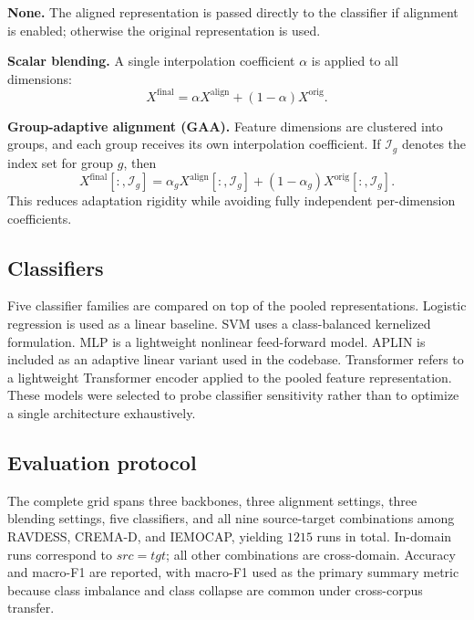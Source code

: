 ﻿\documentclass[10pt,twocolumn,letterpaper]{article}
\begin{document}
\textbf{None.} The aligned representation is passed directly to the classifier if alignment is enabled; otherwise the original representation is used.

\textbf{Scalar blending.} A single interpolation coefficient $\alpha$ is applied to all dimensions:
\begin{equation}
X^{\mathrm{final}} = \alpha X^{\mathrm{align}} + (1-\alpha)X^{\mathrm{orig}}.
\end{equation}

\textbf{Group-adaptive alignment (GAA).} Feature dimensions are clustered into groups, and each group receives its own interpolation coefficient. If $\mathcal{I}_g$ denotes the index set for group $g$, then
\begin{equation}
X^{\mathrm{final}}[:,\mathcal{I}_g] =
\alpha_g X^{\mathrm{align}}[:,\mathcal{I}_g] +
(1-\alpha_g) X^{\mathrm{orig}}[:,\mathcal{I}_g].
\end{equation}
This reduces adaptation rigidity while avoiding fully independent per-dimension coefficients.

\subsection{Classifiers}
Five classifier families are compared on top of the pooled representations. Logistic regression is used as a linear baseline. SVM uses a class-balanced kernelized formulation. MLP is a lightweight nonlinear feed-forward model. APLIN is included as an adaptive linear variant used in the codebase. Transformer refers to a lightweight Transformer encoder applied to the pooled feature representation. These models were selected to probe classifier sensitivity rather than to optimize a single architecture exhaustively.

\subsection{Evaluation protocol}
The complete grid spans three backbones, three alignment settings, three blending settings, five classifiers, and all nine source-target combinations among RAVDESS, CREMA-D, and IEMOCAP, yielding $1215$ runs in total. In-domain runs correspond to $src=tgt$; all other combinations are cross-domain. Accuracy and macro-F1 are reported, with macro-F1 used as the primary summary metric because class imbalance and class collapse are common under cross-corpus transfer.
\end{document}
